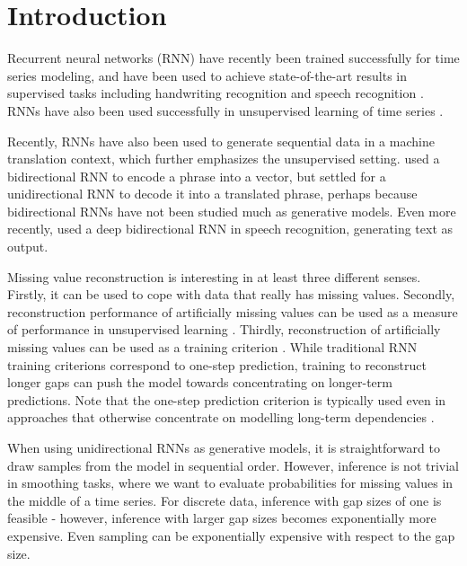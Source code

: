\documentclass{article}
\begin{document}
\section{Introduction}

Recurrent neural networks (RNN) have recently been trained successfully for 
time series modeling, and have been used to achieve state-of-the-art results in 
supervised tasks including handwriting recognition \citep{graves2009novel} and 
speech recognition \citep{graves2013speech}. RNNs have also been used 
successfully in unsupervised learning of time series 
\citep{sutskever2011generating,boulanger2012modeling}. 

Recently, RNNs have also been used to generate sequential data
\citep{bahdanau2014neural} in a machine translation context, which further
emphasizes the unsupervised setting. \citet{bahdanau2014neural}
used a bidirectional RNN to encode a phrase into a vector, but settled for
a unidirectional RNN to decode it into a translated phrase, perhaps because
bidirectional RNNs have not been studied much as generative models.
Even more recently, \citet{maas2014first} used a deep bidirectional RNN in speech
recognition, generating text as output.

Missing value reconstruction is interesting in at least three different senses. 
Firstly, it can be used to cope with data that really has missing values. 
Secondly, reconstruction performance of artificially missing values can be used 
as a measure of performance in unsupervised learning \citep{raiko2001missing}. 
Thirdly, reconstruction of artificially missing values can be used as a 
training criterion \citep{brakel2013training,goodfellow2013multi,uria2014deep}. 
While traditional RNN training criterions correspond to one-step prediction, training to 
reconstruct longer gaps can push the model towards concentrating on longer-term 
predictions. Note that the one-step prediction criterion is typically used even in approaches
that otherwise concentrate on modelling long-term dependencies 
\citep[see e.g.][]{mikolov2014learning,koutnik2014clockwork}.

When using unidirectional RNNs as generative models, it is straightforward to 
draw samples 
from the model in sequential order. However, inference is not trivial in 
smoothing tasks, where we want to evaluate probabilities for missing values in 
the middle of a time series. For discrete data, inference with gap sizes of one is 
feasible - however, inference with larger gap sizes becomes exponentially more 
expensive. Even sampling can be exponentially expensive with respect to the gap 
size.
\end{document}

